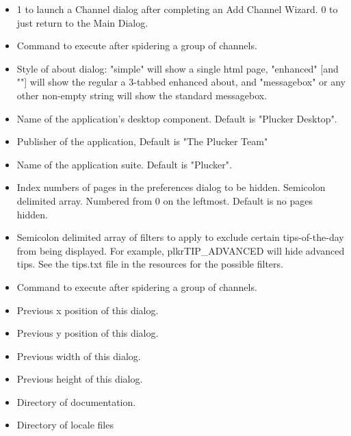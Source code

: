 \begin{helponly}
\begin{itemize}
  \item {} 1 to launch
    a Channel dialog after completing an Add Channel Wizard. 0 to just 
    return to the Main Dialog.
  \item {} Command to execute after spidering a group
    of channels.
  \item {} Style of about dialog: "simple"
    will show a single html page, "enhanced" [and ""] will show the regular
    a 3-tabbed enhanced about, and "messagebox" or any other non-empty string 
    will show the standard messagebox.
  \item {} Name of the application's desktop
    component. Default is "Plucker Desktop".
  \item {} Publisher of the application,
    Default is "The Plucker Team"
  \item {} Name of the application suite. 
    Default is "Plucker".
  \item {} Index numbers of pages
    in the preferences dialog to be hidden. Semicolon delimited array. Numbered 
    from 0 on the leftmost. Default is no pages hidden.
  \item {} Semicolon delimited array of 
   filters to apply to exclude certain tips-of-the-day from being displayed. 
   For example, plkrTIP_ADVANCED will hide advanced tips. See the tips.txt file in
   the resources for the possible filters.
  \item {} Command to execute after spidering a
    group of channels.
  \item {} Previous x position of this dialog.
  \item {} Previous y position of this dialog.
  \item {} Previous width of this dialog.
  \item {} Previous height of this dialog.
  \item {} Directory of \brandingapplicationdesktopname 
     documentation.
  \item {} Directory of \brandingapplicationdesktopname locale files 

\end{itemize}
\end{helponly}
